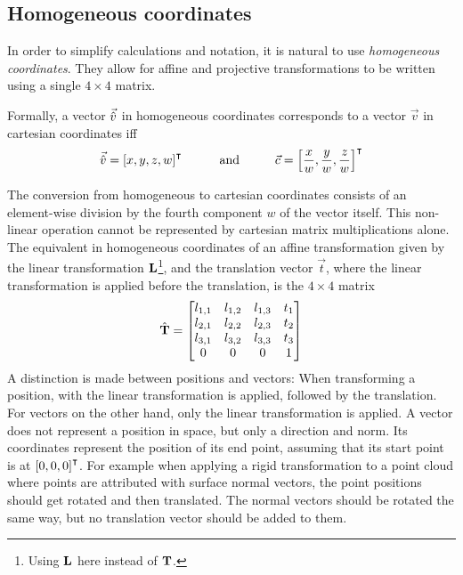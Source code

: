 \subsection{Homogeneous coordinates}
In order to simplify calculations and notation, it is natural to use \emph{homogeneous coordinates}. They allow for affine and projective transformations to be written using a single $4 \times 4$ matrix.

Formally, a vector $\vec{\hat{v}}$ in homogeneous coordinates corresponds to a vector $\vec{v}$ in cartesian coordinates iff
\begin{equation}
	\vec{\hat{v}} = \left[x, y, z, w\right]^\intercal
	\hspace{1cm}\mathrm{and}\hspace{1cm}
	\vec{c} = \left[\frac{x}{w}, \frac{y}{w}, \frac{z}{w}\right]^\intercal
\end{equation}

The conversion from homogeneous to cartesian coordinates consists of an element-wise division by the fourth component $w$ of the vector itself. This non-linear operation cannot be represented by cartesian matrix multiplications alone. The equivalent in homogeneous coordinates of an affine transformation given by the linear transformation $\mathbf{L}$\footnote{Using $\mathbf{L}$ here instead of $\mathbf{T}$.}, and the translation vector $\vec{t}$, where the linear transformation is applied before the translation, is the $4 \times 4$ matrix
\begin{equation}
	\hat{\mathbf{T}} = \left[ \begin{matrix}
		l_{1,1} & l_{1,2} & l_{1,3} & t_1 \\
		l_{2,1} & l_{2,2} & l_{2,3} & t_2 \\
		l_{3,1} & l_{3,2} & l_{3,3} & t_3 \\
		0 & 0 & 0 & 1
	\end{matrix} \right]
\end{equation}
A distinction is made between positions and vectors: When transforming a position, with the linear transformation is applied, followed by the translation. For vectors on the other hand, only the linear transformation is applied. A vector does not represent a position in space, but only a direction and norm. Its coordinates represent the position of its end point, assuming that its start point is at $\left[0, 0, 0\right]^\intercal$. For example when applying a rigid transformation to a point cloud where points are attributed with surface normal vectors, the point positions should get rotated and then translated. The normal vectors should be rotated the same way, but no translation vector should be added to them.

